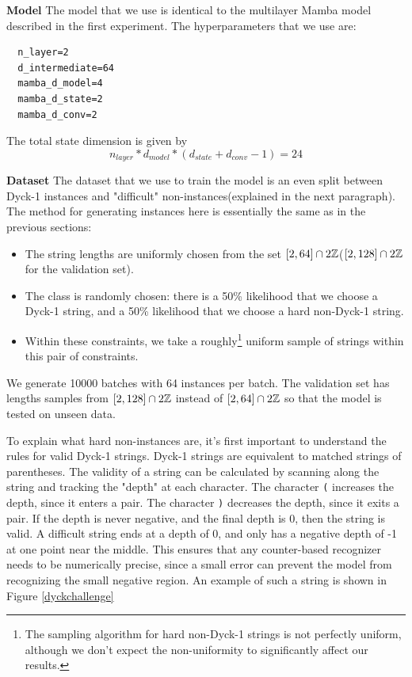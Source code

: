 \textbf{Model}
The model that we use is identical to the multilayer Mamba model described in
the first experiment.
The hyperparameters that we use are:
\begin{verbatim}
  n_layer=2
  d_intermediate=64
  mamba_d_model=4
  mamba_d_state=2
  mamba_d_conv=2
\end{verbatim}
The total state dimension is given by
$$
n_{layer} * d_{model} * (d_{state} + d_{conv} - 1) = 24
$$

\textbf{Dataset}
The dataset that we use to train the model is an even split between Dyck-1
instances and "difficult" non-instances(explained in the next paragraph).
The method for generating instances here is essentially the same as in the
previous sections:
\begin{itemize}
    \item The string lengths are uniformly chosen from the set
        $[2, 64] \cap 2{\mathbb Z}$($[2, 128] \cap 2{\mathbb Z}$ for the validation set).
    \item The class is randomly chosen: there is a 50\% likelihood that we
        choose a Dyck-1 string, and a 50\% likelihood that we choose a hard
        non-Dyck-1 string.
    \item Within these constraints, we take a roughly\footnote{
        The sampling algorithm for hard non-Dyck-1 strings is not perfectly
        uniform, although we don't expect the non-uniformity to significantly
        affect our results.
    } uniform sample of strings within this pair of constraints.

\end{itemize}
We generate 10000 batches with 64 instances per batch. The validation set has
lengths samples from $[2, 128] \cap 2{\mathbb Z}$ instead of $[2, 64] \cap 2{\mathbb Z}$ so that
the model is tested on unseen data.

To explain what hard non-instances are, it's first important to understand the
rules for valid Dyck-1 strings.
Dyck-1 strings are equivalent to matched strings of parentheses.
The validity of a string can be calculated by scanning along the string and
tracking the "depth" at each character. The character \verb|(| increases the
depth, since it enters a pair. The character \verb|)| decreases the depth, since
it exits a pair.
If the depth is never negative, and the final depth is 0, then the string is
valid.
A difficult string ends at a depth of 0, and only has a negative depth of -1 at
one point near the middle.
This ensures that any counter-based recognizer needs to be numerically precise,
since a small error can prevent the model from recognizing the small negative
region.
An example of such a string is shown in Figure \ref{dyckchallenge}

